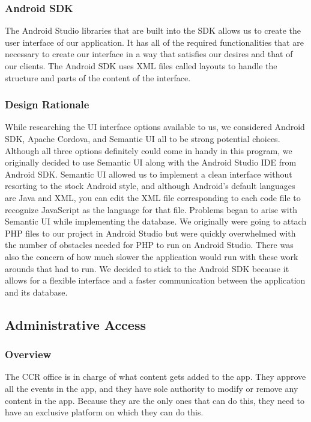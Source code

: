 \documentclass[draftclsnofoot, onecolumn, 10pt, compsoc]{IEEEtran}
\begin{document}
			\subsubsection{Android SDK}
				The Android Studio libraries that are built into the SDK allows us to create the user interface of our application. It has all of the required functionalities that are necessary to create our interface in a way that satisfies our desires and that of our clients. The Android SDK uses XML files called layouts to handle the structure and parts of the content of the interface.
			\subsubsection{Design Rationale}
				While researching the UI interface options available to us, we considered Android SDK, Apache Cordova, and Semantic UI all to be strong potential choices. Although all three options definitely could come in handy in this program, we originally decided to use Semantic UI along with the Android Studio IDE from Android SDK. Semantic UI allowed us to implement a clean interface without resorting to the stock Android style, and although Android’s default languages are Java and XML, you can edit the XML file corresponding to each code file to recognize JavaScript as the language for that file. Problems began to arise with Semantic UI while implementing the database. We originally were going to attach PHP files to our project in Android Studio but were quickly overwhelmed with the number of obstacles needed for PHP to run on Android Studio. There was also the concern of how much slower the application would run with these work arounds that had to run. We decided to stick to the Android SDK because it allows for a flexible interface and a faster communication between the application and its database.


		\subsection{Administrative Access}
			\subsubsection{Overview}
				The CCR office is in charge of what content gets added to the app. They approve all the events in the app, and they have sole authority to modify or remove any content in the app. Because they are the only ones that can do this, they need to have an exclusive platform on which they can do this.
\end{document}
